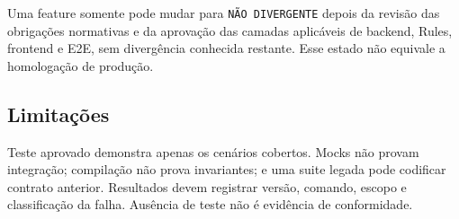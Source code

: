 Uma feature somente pode mudar para \texttt{NÃO DIVERGENTE} depois da revisão
das obrigações normativas e da aprovação das camadas aplicáveis de backend,
Rules, frontend e E2E, sem divergência conhecida restante. Esse estado não
equivale a homologação de produção.

\subsection{Limitações}

Teste aprovado demonstra apenas os cenários cobertos. Mocks não provam integração;
compilação não prova invariantes; e uma suite legada pode codificar contrato
anterior. Resultados devem registrar versão, comando, escopo e classificação da
falha. Ausência de teste não é evidência de conformidade.
